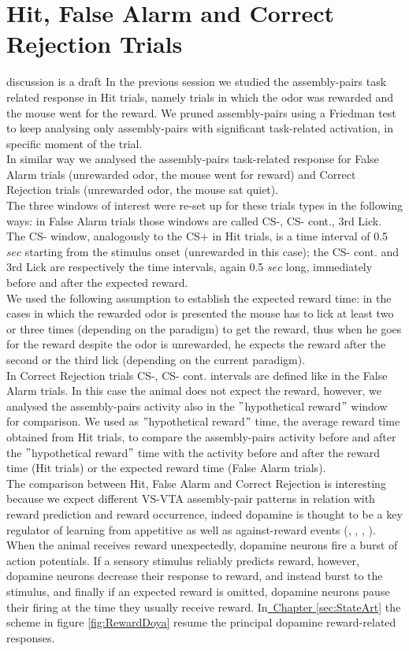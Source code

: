 \section{Hit, False Alarm and Correct Rejection Trials}
\label{sec:FalseAlCorrRej}
{\color{red} discussion is a draft}
In the previous session we studied the assembly-pairs task related response in Hit trials, namely trials in which the odor was rewarded and the mouse went for the reward. We pruned assembly-pairs using a Friedman test to keep analysing only assembly-pairs with significant task-related activation, in specific moment of the trial.\\In similar way we analysed the assembly-pairs task-related response for False Alarm trials (unrewarded odor, the mouse went for reward) and Correct Rejection trials (unrewarded odor, the mouse sat quiet).\\The three windows of interest were re-set up for these trials types in the following ways: in False Alarm trials those windows are called CS-, CS- cont., 3rd Lick. The CS- window, analogously to the CS+ in Hit trials, is a time interval of 0.5 $sec$ starting from the stimulus onset (unrewarded in this case); the CS- cont. and 3rd Lick are respectively the time intervals, again 0.5 $sec$ long, immediately before and after the expected reward.\\We used the following assumption to establish the expected reward time: in the cases in which the rewarded odor is presented the mouse has to lick at least two or three times (depending on the paradigm) to get the reward, thus when he goes for the reward despite the odor is unrewarded, he expects the reward after the second or the third lick (depending on the current paradigm).\\In Correct Rejection trials CS-, CS- cont. intervals are defined like in the False Alarm trials. In this case the animal does not expect the reward, however, we analysed the assembly-pairs activity also in the $"$hypothetical reward$"$ window for comparison. We used as $"$hypothetical reward$"$ time, the average reward time obtained from Hit trials, to compare the assembly-pairs activity before and after the $"$hypothetical reward$"$ time with the activity before and after the reward time (Hit trials) or the expected reward time (False Alarm trials).\\The comparison between Hit, False Alarm and Correct Rejection is interesting because we expect different VS-VTA assembly-pair patterns in relation with reward prediction and reward occurrence, indeed dopamine is thought to be a key regulator of learning from appetitive as well as against-reward events (\cite{Schultz1997}, \cite{Wenzel}, \cite{Fiorillo2013b}, \cite{Schultz2015}).\\When the animal receives reward unexpectedly, dopamine neurons fire a burst of action potentials. If a sensory stimulus reliably predicts reward, however, dopamine neurons decrease their response to reward, and instead burst to the stimulus, and finally if an expected reward is omitted, dopamine neurons pause their firing at the time they usually receive reward. In\hyperref[sec:StateArt]{~Chapter \ref*{sec:StateArt}} the scheme in figure \ref{fig:RewardDoya} resume the principal dopamine reward-related responses.\\
